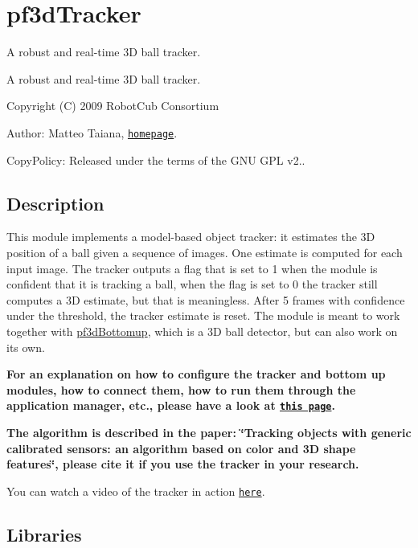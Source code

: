\section{pf3d\+Tracker}
\label{group__icub__pf3dTracker}


A robust and real-\/time 3D ball tracker.  


A robust and real-\/time 3D ball tracker. 

Copyright (C) 2009 Robot\+Cub Consortium

Author\+: Matteo Taiana, \href{http://users.isr.ist.utl.pt/~mtaiana/}{\tt homepage}.

Copy\+Policy\+: Released under the terms of the G\+NU G\+PL v2..\hypertarget{group__src__demoYoga_intro_sec}{}\subsection{Description}\label{group__src__demoYoga_intro_sec}
This module implements a model-\/based object tracker\+: it estimates the 3D position of a ball given a sequence of images. One estimate is computed for each input image. The tracker outputs a flag that is set to 1 when the module is confident that it is tracking a ball, when the flag is set to 0 the tracker still computes a 3D estimate, but that is meaningless. After 5 frames with confidence under the threshold, the tracker estimate is reset. The module is meant to work together with \hyperlink{group__icub__pf3dBottomup}{pf3d\+Bottomup}, which is a 3D ball detector, but can also work on its own.

{\bfseries For an explanation on how to configure the tracker and bottom up modules, how to connect them, how to run them through the application manager, etc., please have a look at \href{http://mediawiki.isr.ist.utl.pt/wiki/3D_ball_tracker}{\tt this page}.}

{\bfseries The algorithm is described in the paper\+: \char`\"{}\+Tracking objects with generic calibrated sensors\+: an algorithm based on color and 3\+D shape features\char`\"{}, please cite it if you use the tracker in your research.}

You can watch a video of the tracker in action \href{http://www.youtube.com/watch?v=Xp8qUhfMzhU}{\tt here}.\hypertarget{group__src__demoYoga_lib_sec}{}\subsection{Libraries}\label{group__src__demoYoga_lib_sec}

